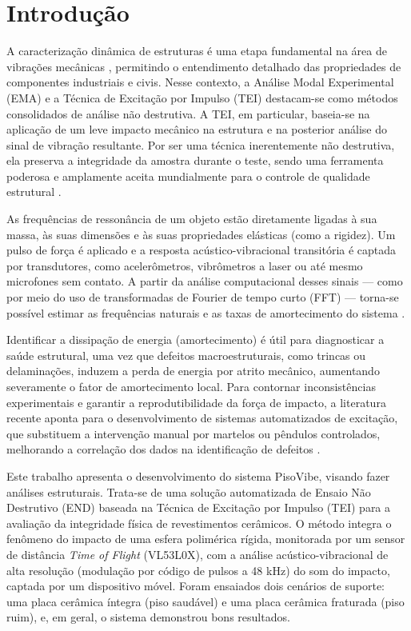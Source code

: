 \documentclass[10pt,twocolumn,fleqn]{article}
\begin{document}
	\section{Introdução}
	
	A caracterização dinâmica de estruturas é uma etapa fundamental na área de vibrações mecânicas \cite{blaschke2017non}, permitindo o entendimento detalhado das propriedades de componentes industriais e civis. Nesse contexto, a Análise Modal Experimental (EMA) e a Técnica de Excitação por Impulso (TEI) destacam-se como métodos consolidados de análise não destrutiva. A TEI, em particular, baseia-se na aplicação de um leve impacto mecânico na estrutura e na posterior análise do sinal de vibração resultante. Por ser uma técnica inerentemente não destrutiva, ela preserva a integridade da amostra durante o teste, sendo uma ferramenta poderosa e amplamente aceita mundialmente para o controle de qualidade estrutural \cite{roebben1997impulse}.
	
	As frequências de ressonância de um objeto estão diretamente ligadas à sua massa, às suas dimensões e às suas propriedades elásticas (como a rigidez). Um pulso de força é aplicado e a resposta acústico-vibracional transitória é captada por transdutores, como acelerômetros, vibrômetros a laser ou até mesmo microfones sem contato. A partir da análise computacional desses sinais — como por meio do uso de transformadas de Fourier de tempo curto (FFT) — torna-se possível estimar as frequências naturais e as taxas de amortecimento do sistema \cite{roebben1997impulse}.
	
	Identificar a dissipação de energia (amortecimento) é útil para diagnosticar a saúde estrutural, uma vez que defeitos macroestruturais, como trincas ou delaminações, induzem a perda de energia por atrito mecânico, aumentando severamente o fator de amortecimento local. Para contornar inconsistências experimentais e garantir a reprodutibilidade da força de impacto, a literatura recente aponta para o desenvolvimento de sistemas automatizados de excitação, que substituem a intervenção manual por martelos ou pêndulos controlados, melhorando a correlação dos dados na identificação de defeitos \cite{nikolaev2014estimation}.
	
Este trabalho apresenta o desenvolvimento do sistema PisoVibe, visando fazer análises estruturais. Trata-se de uma solução automatizada de Ensaio Não Destrutivo (END) baseada na Técnica de Excitação por Impulso (TEI) para a avaliação da integridade física de revestimentos cerâmicos. O método integra o fenômeno do impacto de uma esfera polimérica rígida, monitorada por um sensor de distância \textit{Time of Flight} (VL53L0X), com a análise acústico-vibracional de alta resolução (modulação por código de pulsos a 48 kHz) do som do impacto, captada por um dispositivo móvel. Foram ensaiados dois cenários de suporte: uma placa cerâmica íntegra (piso saudável) e uma placa cerâmica fraturada (piso ruim), e, em geral, o sistema demonstrou bons resultados.
	
\end{document}
